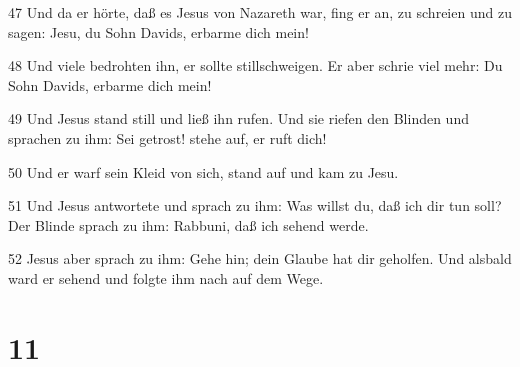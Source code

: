\par 47 Und da er hörte, daß es Jesus von Nazareth war, fing er an, zu schreien und zu sagen: Jesu, du Sohn Davids, erbarme dich mein!
\par 48 Und viele bedrohten ihn, er sollte stillschweigen. Er aber schrie viel mehr: Du Sohn Davids, erbarme dich mein!
\par 49 Und Jesus stand still und ließ ihn rufen. Und sie riefen den Blinden und sprachen zu ihm: Sei getrost! stehe auf, er ruft dich!
\par 50 Und er warf sein Kleid von sich, stand auf und kam zu Jesu.
\par 51 Und Jesus antwortete und sprach zu ihm: Was willst du, daß ich dir tun soll? Der Blinde sprach zu ihm: Rabbuni, daß ich sehend werde.
\par 52 Jesus aber sprach zu ihm: Gehe hin; dein Glaube hat dir geholfen. Und alsbald ward er sehend und folgte ihm nach auf dem Wege.

\chapter{11}

